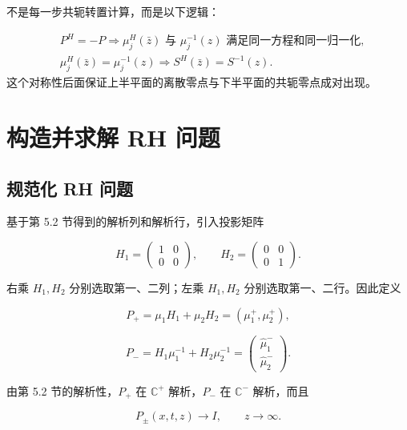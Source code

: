 \documentclass[
    lang=cn,
    scheme=chinese,
    mode=simple,
    device=normal,
    color=blue,
    math=cm,
    thmcnt=section,
    12pt,
    nowatermark
]{elegantbook}
\begin{document}
\begin{callout}[2.2 节真正要记住什么？]
    不是每一步共轭转置计算，而是以下逻辑：

    \[
        \begin{aligned}
             & P^H=-P
            \Longrightarrow
            \mu_j^H(\bar z)\text{ 与 }\mu_j^{-1}(z)
            \text{ 满足同一方程和同一归一化},
            \\
             & \mu_j^H(\bar z)=\mu_j^{-1}(z)
            \Longrightarrow
            S^H(\bar z)=S^{-1}(z).
        \end{aligned}
    \]
    这个对称性后面保证上半平面的离散零点与下半平面的共轭零点成对出现。
\end{callout}

\section{构造并求解 RH 问题}

\subsection{规范化 RH 问题}

基于第 5.2 节得到的解析列和解析行，引入投影矩阵

\begin{equation}
    H_1=
    \begin{pmatrix}
        1 & 0 \\
        0 & 0
    \end{pmatrix},
    \qquad
    H_2=
    \begin{pmatrix}
        0 & 0 \\
        0 & 1
    \end{pmatrix}.
    \tag{5.3.1}
    \label{eq:5.3.1}
\end{equation}

右乘 $H_1,H_2$ 分别选取第一、二列；左乘 $H_1,H_2$ 分别选取第一、二行。因此定义

\[
    P_+
    =
    \mu_1H_1+\mu_2H_2
    =
    (\mu_1^+,\mu_2^+),
\]

\[
    P_-
    =
    H_1\mu_1^{-1}+H_2\mu_2^{-1}
    =
    \begin{pmatrix}
        \widehat\mu_1^- \\
        \widehat\mu_2^-
    \end{pmatrix}.
\]

由第 5.2 节的解析性，$P_+$ 在 $\mathbb{C}^+$ 解析，$P_-$ 在 $\mathbb{C}^-$ 解析，而且

\[
    P_\pm(x,t,z)\to I,\qquad z\to\infty.
\]
\end{document}
